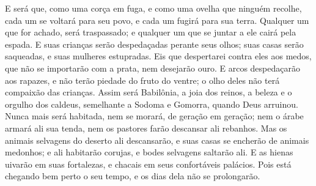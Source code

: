 {E será que, como uma corça em fuga, e como uma ovelha que ninguém recolhe, cada um se voltará para seu povo, e cada um fugirá para sua terra.
Qualquer um que for achado, será traspassado; e qualquer um que se juntar a ele cairá pela espada.
E suas crianças serão despedaçadas perante seus olhos; suas casas serão saqueadas, e suas mulheres estupradas.
Eis que despertarei contra eles aos medos, que não se importarão com a prata, nem desejarão ouro.
E
{} arcos despedaçarão aos rapazes, e não terão piedade do fruto do ventre; o olho deles não terá compaixão das crianças.
Assim será Babilônia, a joia dos reinos, a beleza e o orgulho dos caldeus, semelhante a Sodoma e Gomorra, quando Deus
{} arruinou.
Nunca mais será habitada, nem
{} se morará, de geração em geração; nem o árabe armará ali sua tenda, nem os pastores farão descansar ali
{} rebanhos.
Mas os animais selvagens do deserto ali descansarão, e suas casas se encherão de animais medonhos; e ali habitarão corujas,
 e bodes selvagens saltarão ali.
E as hienas uivarão em suas fortalezas, e chacais em seus confortáveis palácios. Pois está chegando bem perto o seu tempo, e os dias dela não se prolongarão.

}
